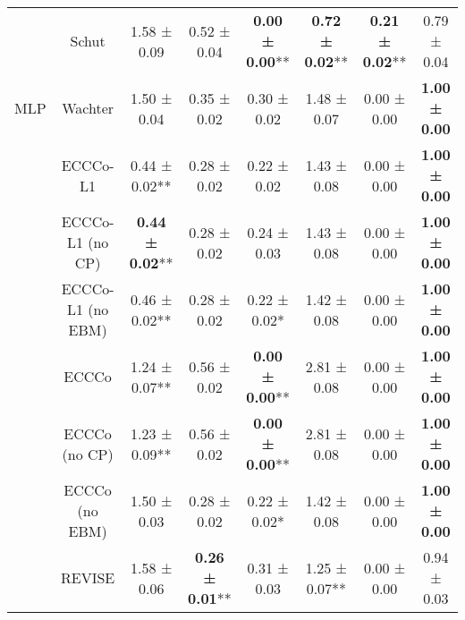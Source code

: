\begin{table}
{\begin{tabular}[t]{cccccccc}
 & Schut & 1.58 ± 0.09\hphantom{*}\hphantom{*} & 0.52 ± 0.04\hphantom{*}\hphantom{*} & \textbf{0.00 ± 0.00}** & \textbf{0.72 ± 0.02}** & \textbf{0.21 ± 0.02}** & 0.79 ± 0.04\hphantom{*}\hphantom{*}\\

\multirow[t]{-9}{*}{\centering\arraybackslash MLP} & Wachter & 1.50 ± 0.04\hphantom{*}\hphantom{*} & 0.35 ± 0.02\hphantom{*}\hphantom{*} & 0.30 ± 0.02\hphantom{*}\hphantom{*} & 1.48 ± 0.07\hphantom{*}\hphantom{*} & 0.00 ± 0.00\hphantom{*}\hphantom{*} & \textbf{1.00 ± 0.00}\hphantom{*}\hphantom{*}\\
\cmidrule{1-8}
 & ECCCo-L1 & 0.44 ± 0.02** & 0.28 ± 0.02\hphantom{*}\hphantom{*} & 0.22 ± 0.02\hphantom{*}\hphantom{*} & 1.43 ± 0.08\hphantom{*}\hphantom{*} & 0.00 ± 0.00\hphantom{*}\hphantom{*} & \textbf{1.00 ± 0.00}\hphantom{*}\hphantom{*}\\

 & ECCCo-L1 (no CP) & \textbf{0.44 ± 0.02}** & 0.28 ± 0.02\hphantom{*}\hphantom{*} & 0.24 ± 0.03\hphantom{*}\hphantom{*} & 1.43 ± 0.08\hphantom{*}\hphantom{*} & 0.00 ± 0.00\hphantom{*}\hphantom{*} & \textbf{1.00 ± 0.00}\hphantom{*}\hphantom{*}\\

 & ECCCo-L1 (no EBM) & 0.46 ± 0.02** & 0.28 ± 0.02\hphantom{*}\hphantom{*} & 0.22 ± 0.02*\hphantom{*} & 1.42 ± 0.08\hphantom{*}\hphantom{*} & 0.00 ± 0.00\hphantom{*}\hphantom{*} & \textbf{1.00 ± 0.00}\hphantom{*}\hphantom{*}\\

 & ECCCo & 1.24 ± 0.07** & 0.56 ± 0.02\hphantom{*}\hphantom{*} & \textbf{0.00 ± 0.00}** & 2.81 ± 0.08\hphantom{*}\hphantom{*} & 0.00 ± 0.00\hphantom{*}\hphantom{*} & \textbf{1.00 ± 0.00}\hphantom{*}\hphantom{*}\\

 & ECCCo (no CP) & 1.23 ± 0.09** & 0.56 ± 0.02\hphantom{*}\hphantom{*} & \textbf{0.00 ± 0.00}** & 2.81 ± 0.08\hphantom{*}\hphantom{*} & 0.00 ± 0.00\hphantom{*}\hphantom{*} & \textbf{1.00 ± 0.00}\hphantom{*}\hphantom{*}\\

 & ECCCo (no EBM) & 1.50 ± 0.03\hphantom{*}\hphantom{*} & 0.28 ± 0.02\hphantom{*}\hphantom{*} & 0.22 ± 0.02*\hphantom{*} & 1.42 ± 0.08\hphantom{*}\hphantom{*} & 0.00 ± 0.00\hphantom{*}\hphantom{*} & \textbf{1.00 ± 0.00}\hphantom{*}\hphantom{*}\\

 & REVISE & 1.58 ± 0.06\hphantom{*}\hphantom{*} & \textbf{0.26 ± 0.01}** & 0.31 ± 0.03\hphantom{*}\hphantom{*} & 1.25 ± 0.07** & 0.00 ± 0.00\hphantom{*}\hphantom{*} & 0.94 ± 0.03\hphantom{*}\hphantom{*}\\


\end{tabular}}
\end{table}
